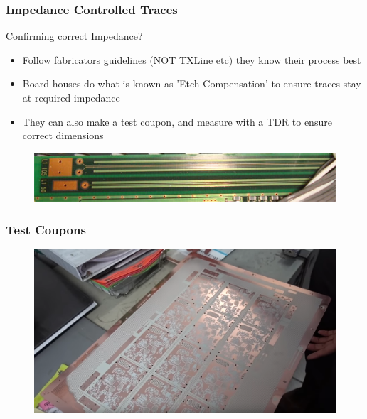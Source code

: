 \documentclass[t]{beamer}
\begin{document}
\begin{frame}
\frametitle{Impedance Controlled Traces}
Confirming correct Impedance?\\
\begin{itemize}
	\item Follow fabricators guidelines (NOT TXLine etc) they know their process best
	\item Board houses do what is known as 'Etch Compensation' to ensure traces stay at required impedance
	\item They can also make a test coupon, and measure with a TDR to ensure correct dimensions
\end{itemize}
\begin{figure}
	\includegraphics[width=\linewidth]{testCoupon.jpg}
\end{figure}
\end{frame}
\begin{frame}
	\frametitle{Test Coupons}
	\begin{figure}
		\includegraphics[width=\linewidth]{testCoupon_2.png}
	\end{figure}
\end{frame}
\end{document}
